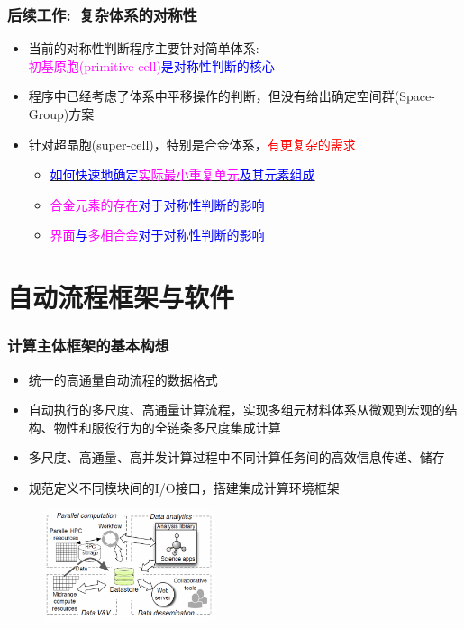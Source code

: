 \documentclass[cjk,slidestop,handout,compress,mathserif,blue]{beamer}	%
\begin{document}
\frame
{
	\frametitle{后续工作:~复杂体系的对称性}
	\begin{itemize}
   		\setlength{\itemsep}{15pt}
		\item 当前的对称性判断程序主要针对简单体系:\\
			\textcolor{blue}{\textcolor{magenta}{初基原胞(\textrm{primitive cell})}是对称性判断的核心}
		\item 程序中已经考虑了体系中平移操作的判断，但没有给出确定空间群(\textrm{Space-Group})方案
		\item 针对超晶胞(\textrm{super-cell})，特别是合金体系，\textcolor{red}{有更复杂的需求}
			\begin{itemize}
   				\setlength{\itemsep}{10pt}
				\item \underline{\textcolor{blue}{如何快速地确定\textcolor{magenta}{实际最小重复单元}及其元素组成}}
				\item \textcolor{blue}{\textcolor{magenta}{合金元素的存在}对于对称性判断的影响}
				\item \textcolor{blue}{\textcolor{magenta}{界面}与\textcolor{magenta}{多相合金}对于对称性判断的影响}
			\end{itemize}
	\end{itemize}
}

\section{自动流程框架与软件}
\frame
{
	\frametitle{计算主体框架的基本构想}
	\begin{itemize}
		\item 统一的高通量自动流程的数据格式
		\item 自动执行的多尺度、高通量计算流程，实现多组元材料体系从微观到宏观的结构、物性和服役行为的全链条多尺度集成计算
		\item 多尺度、高通量、高并发计算过程中不同计算任务间的高效信息传递、储存
		\item 规范定义不同模块间的I/O接口，搭建集成计算环境框架
	\end{itemize}
\begin{figure}[h!]
\centering
\vspace*{-0.2in}
\includegraphics[height=1.3in,width=2.0in,viewport=0 0 680 460,clip]{Figures/Parallel_computation.png}
\caption{\fontsize{5.2pt}{2.5pt}}%
\label{parallel_computation}
\end{figure} 
}
\end{document}
